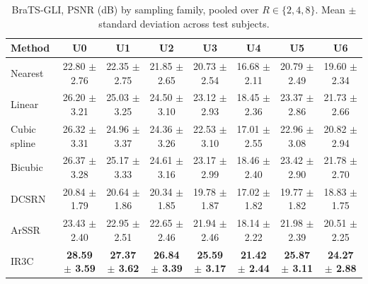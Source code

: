 \begin{table}[pos=!htbp]
\caption{BraTS-GLI, PSNR (dB) by sampling family, pooled over $R\in\{2,4,8\}$. Mean $\pm$ standard deviation across test subjects.}
\label{tab:detailfam-brats}
\footnotesize
\begin{tabular*}{\textwidth}{@{\extracolsep{\fill}}lccccccc@{}}
\toprule
Method & U0 & U1 & U2 & U3 & U4 & U5 & U6 \\
\midrule
Nearest & 22.80 $\pm$ 2.76 & 22.35 $\pm$ 2.75 & 21.85 $\pm$ 2.65 & 20.73 $\pm$ 2.54 & 16.68 $\pm$ 2.11 & 20.79 $\pm$ 2.49 & 19.60 $\pm$ 2.34 \\
Linear & 26.20 $\pm$ 3.21 & 25.03 $\pm$ 3.25 & 24.50 $\pm$ 3.10 & 23.12 $\pm$ 2.93 & 18.45 $\pm$ 2.36 & 23.37 $\pm$ 2.86 & 21.73 $\pm$ 2.66 \\
Cubic spline & 26.32 $\pm$ 3.31 & 24.96 $\pm$ 3.37 & 24.36 $\pm$ 3.26 & 22.53 $\pm$ 3.10 & 17.01 $\pm$ 2.55 & 22.96 $\pm$ 3.08 & 20.82 $\pm$ 2.94 \\
Bicubic & 26.37 $\pm$ 3.28 & 25.17 $\pm$ 3.33 & 24.61 $\pm$ 3.16 & 23.17 $\pm$ 2.99 & 18.46 $\pm$ 2.40 & 23.42 $\pm$ 2.90 & 21.78 $\pm$ 2.70 \\
DCSRN & 20.84 $\pm$ 1.79 & 20.64 $\pm$ 1.86 & 20.34 $\pm$ 1.85 & 19.78 $\pm$ 1.87 & 17.02 $\pm$ 1.82 & 19.77 $\pm$ 1.82 & 18.83 $\pm$ 1.75 \\
ArSSR & 23.43 $\pm$ 2.40 & 22.95 $\pm$ 2.51 & 22.65 $\pm$ 2.46 & 21.94 $\pm$ 2.46 & 18.14 $\pm$ 2.22 & 21.98 $\pm$ 2.39 & 20.51 $\pm$ 2.25 \\
IR3C & \textbf{28.59 $\pm$ 3.59} & \textbf{27.37 $\pm$ 3.62} & \textbf{26.84 $\pm$ 3.39} & \textbf{25.59 $\pm$ 3.17} & \textbf{21.42 $\pm$ 2.44} & \textbf{25.87 $\pm$ 3.11} & \textbf{24.27 $\pm$ 2.88} \\
\bottomrule
\end{tabular*}
\end{table}


